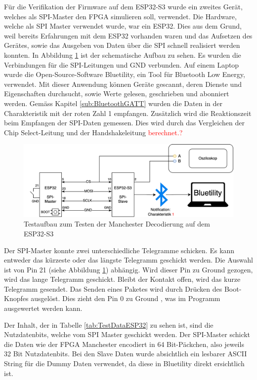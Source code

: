 Für die Verifikation der Firmware auf dem ESP32-S3 wurde ein zweites Gerät, welches als SPI-Master den FPGA simulieren soll, verwendet. Die Hardware, welche als SPI Master verwendet wurde, war ein ESP32. Dies aus dem Grund, weil bereits Erfahrungen mit dem ESP32 vorhanden waren und das Aufsetzen des Gerätes, sowie das Ausgeben von Daten über die SPI schnell realisiert werden konnten. In Abbildung \ref{fig:TestszenarioESP32} ist der schematische Aufbau zu sehen. Es wurden die Verbindungen für die SPI-Leitungen und GND verbunden. Auf einem Laptop wurde die Open-Source-Software Bluetility, ein Tool für Bluetooth Low Energy, verwendet. Mit dieser Anwendung können Geräte gescannt, deren Dienste und Eigenschaften durchsucht, sowie Werte gelesen, geschrieben und abonniert werden. Gemäss Kapitel \ref{sub:BluetoothGATT} wurden die Daten in der Charakteristik mit der roten Zahl 1 empfangen. Zusätzlich wird die Reaktionszeit beim Empfangen der SPI-Daten gemessen. Dies wird durch das Vergleichen der Chip Select-Leitung und der Handshakeleitung \textcolor{red}{berechnet.?} 

\begin{figure}[H]
    \centering
    \includegraphics[width=0.9\linewidth]{Figures/Chap3/Testszenarien/Testszenario_ESP32.png}
    \caption{Testaufbau zum Testen der Manchester Decodierung auf dem ESP32-S3}
    \label{fig:TestszenarioESP32}
\end{figure}

Der SPI-Master konnte zwei unterschiedliche Telegramme schicken. Es kann entweder das kürzeste oder das längste Telegramm geschickt werden. Die Auswahl ist von Pin 21 (siehe Abbildung \ref{fig:TestszenarioESP32}) abhängig. Wird dieser Pin zu Ground gezogen, wird das lange Telegramm geschickt. Bleibt der Kontakt offen, wird das kurze Telegramm gesendet. Das Senden eines Paketes wird durch Drücken des Boot-Knopfes ausgelöst. Dies zieht den Pin 0 zu Ground , was im Programm ausgewertet werden kann. 

Der Inhalt, der in Tabelle \ref{tab:TestDataESP32} zu sehen ist, sind die Nutzdatenbits, welche vom SPI Master geschickt werden. Der SPI-Master schickt die Daten wie der FPGA Manchester encodiert in 64 Bit-Päckchen, also jeweils 32 Bit Nutzdatenbits. Bei den Slave Daten wurde absichtlich ein lesbarer ASCII String für die Dummy Daten verwendet, da diese in Bluetility direkt ersichtlich ist.

